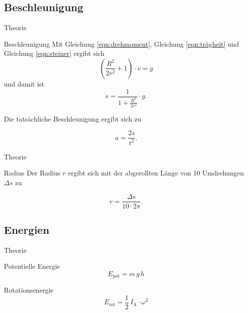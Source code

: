 \subsection{Beschleunigung}
\begin{frame}[t]{Theorie}
    \begin{block}{Beschleunigung}
    Mit Gleichung \eqref{eqn:drehmoment}, Gleichung \eqref{eqn:trägheit} und Gleichung \eqref{eqn:steiner} ergibt sich
    \begin{equation*}
       \left(\frac{R^2}{2 r^2} +1\right) \cdot \dot{v} = g
    \end{equation*}
   und damit ist  
    \begin{equation*}
        \ddot{s} = \frac{1}{1 + \frac{R^2}{2r^2}} \cdot g.
    \end{equation*}

    Die tatsächliche Beschleunigung ergibt sich zu 
    
    \begin{equation*}
        a = \frac{2s}{t^2}.
    \end{equation*}
    \end{block}
\end{frame}

\begin{frame}[t]{Theorie}
    \begin{block}{Radius}
    Der Radius $r$ ergibt sich mit der abgerollten Länge von 10 Umdrehungen $\Delta s$ zu

    \begin{equation*}
        r = \frac{\Delta s}{10 \cdot 2\pi}.
    \end{equation*}
    \end{block}
\end{frame}


\subsection{Energien}

\begin{frame}[t]{Theorie}
    \begin{block}{Potentielle Energie}
    \begin{equation}
    E_\text{pot} = m\, g\, h 
    \end{equation}
    \end{block}

    \begin{block}{Rotationsenergie}
    \begin{equation}
        E_\text{rot} = \frac{1}{2}\, I_\text{A} \cdot \omega^2
    \end{equation}
    \end{block}
\end{frame}

